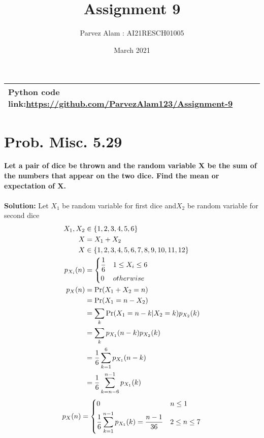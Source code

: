 \documentclass{article}
\title{Assignment 9}
\author{Parvez Alam : AI21RESCH01005 }
\date{March 2021}
\begin{document}
\maketitle
\begin{multicols}{2}
\begin{center}
    \begin{tabular}{|p{5cm}|}
    \hline
        Python code link:\url{https://github.com/ParvezAlam123/Assignment-9} \\
        \hline
    \end{tabular}
\end{center}


\section{Prob. Misc. 5.29}
\textbf{Let a pair of dice be thrown and the random variable X be the sum of the numbers that appear on the two dice. Find the mean or expectation of X.} \\ \\
\textbf{Solution:} 
Let \(X_1\) be random variable for first dice and\( X_2\) be random variable for second dice
\begin{align}
    X_1, X_2 &\in \{1,2,3,4,5,6\}  \nonumber \\
    X &= X_1+X_2 \nonumber  \nonumber \\
    X &\in \{1,2,3,4,5,6,7,8,9,10,11,12\} \nonumber  \\
    p_{X_i}(n)&=\begin{dcases}
           \frac{1}{6} & 1 \leq X_i \leq 6 \\
           0 & otherwise
           \end{dcases} \nonumber \\
    p_{X}(n)&=\Pr(X_1+X_2=n) \nonumber \\
            &=\Pr(X_1=n-X_2) \nonumber \\
            &=\sum_k \Pr(X_1=n-k|X_2=k)p_{X_2}(k) \nonumber \\
            &=\sum_k p_{X_1}(n-k)p_{X_2}(k) \nonumber \\
            &=\frac{1}{6}\sum_{k=1}^6 p_{X_1}(n-k) \nonumber \\
            &=\frac{1}{6}\sum_{k=n-6}^{n-1}p_{X_1}(k) \nonumber 
\end{align}
\[p_{X}(n)=\begin{dcases}
           0 & n \leq 1 \\
           \frac{1}{6}\sum_{k=1}^{n-1}p_{X_1}(k)=\frac{n-1}{36} & 2 \leq n \leq 7 \\

\end{dcases}\]
\end{multicols}
\end{document}

